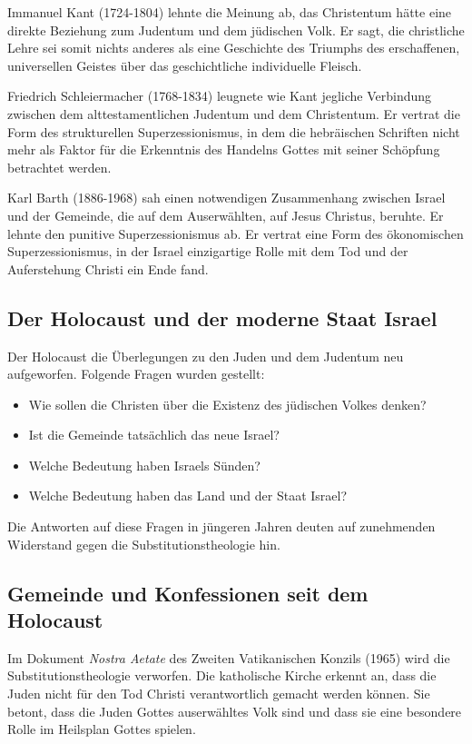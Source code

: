 \documentclass{../../inc/mybib}
\newcommand{\st}{Substitutionstheolog}
\newcommand{\sz}{Superzessionismus}
\begin{document}
    Immanuel Kant (1724-1804) lehnte die Meinung ab, das Christentum hätte eine direkte Beziehung zum Judentum und dem jüdischen Volk. Er sagt, die christliche Lehre sei somit nichts anderes als eine Geschichte des Triumphs des erschaffenen, universellen Geistes über das geschichtliche individuelle Fleisch.

    Friedrich Schleiermacher (1768-1834) leugnete wie Kant jegliche Verbindung zwischen dem alttestamentlichen Judentum und dem Christentum. Er vertrat die Form des strukturellen \sz, in dem die hebräischen Schriften nicht mehr als Faktor für die Erkenntnis des Handelns Gottes mit seiner Schöpfung betrachtet werden.

    Karl Barth (1886-1968) sah einen notwendigen Zusammenhang zwischen Israel und der Gemeinde, die auf dem Auserwählten, auf Jesus Christus, beruhte. Er lehnte den punitive \sz{} ab. Er vertrat eine Form des ökonomischen \sz, in der Israel einzigartige Rolle mit dem Tod und der Auferstehung Christi ein Ende fand.

    \subsection{Der Holocaust und der moderne Staat Israel}
    Der Holocaust die Überlegungen zu den Juden und dem Judentum neu aufgeworfen. Folgende Fragen wurden gestellt:
    \begin{itemize}
        \item Wie sollen die Christen über die Existenz des jüdischen Volkes denken?
        \item Ist die Gemeinde tatsächlich das neue Israel?
        \item Welche Bedeutung haben Israels Sünden?
        \item Welche Bedeutung haben das Land und der Staat Israel?
    \end{itemize}

    Die Antworten auf diese Fragen in jüngeren Jahren deuten auf zunehmenden Widerstand gegen die \st ie hin.

    \subsection{Gemeinde und Konfessionen seit dem Holocaust}
    Im Dokument \textit{Nostra Aetate} des Zweiten Vatikanischen Konzils (1965) wird die \st ie verworfen. Die katholische Kirche erkennt an, dass die Juden nicht für den Tod Christi verantwortlich gemacht werden können. Sie betont, dass die Juden Gottes auserwähltes Volk sind und dass sie eine besondere Rolle im Heilsplan Gottes spielen.
\end{document}
